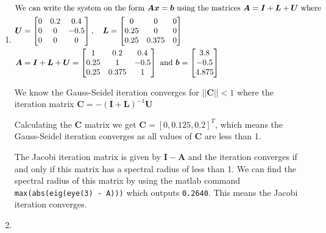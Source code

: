 \documentclass[a4paper]{article}
\begin{document}
\begin{enumerate}[label=\alph*)]
    \item 
        \begin{align}
            \intertext{We can write the system on the form \(\bm{A}\bm{x} =
                \bm{b}\) using the matrices \(\bm{A} = \bm{I} + \bm{L} +
                \bm{U}\) where}
            \bm{U} &=
            \begin{bmatrix}
                0 & 0.2 & 0.4 \\
                0 & 0 & -0.5 \\
                0 & 0 & 0 \\
            \end{bmatrix}, \quad
            \bm{L} =
            \begin{bmatrix}
                0 & 0 & 0 \\
                0.25 & 0 & 0 \\
                0.25 & 0.375 & 0 \\
            \end{bmatrix} \\
            \bm{A} &= \bm{I} + \bm{L} + \bm{U} =
            \begin{bmatrix}
                1 & 0.2 & 0.4 \\
                0.25 & 1 & -0.5 \\
                0.25 & 0.375 & 1 \\
            \end{bmatrix} 
            \text{ and }
            \bm{b} = 
                \begin{bmatrix}
                    3.8 \\
                    -0.5 \\
                    4.875 \\
                \end{bmatrix}
        \end{align}

        We know the Gauss-Seidel iteration converges for \(||\bm{C}|| < 1\)
            where the iteration matrix \(\bm{C} = -(\bm{I}+\bm{L})^{-1}\bm{U}\)

        Calculating the \(\bm{C}\) matrix we get \(\bm{C} = [0, 0.125,
            0.2]^T\), which means the Gauss-Seidel iteration converges as all values of \(\bm{C}\) are less than 1.

        The Jacobi iteration matrix is given by \(\bm{I} - \bm{A}\) and the
            iteration converges if and only if this matrix has a spectral
            radius of less than 1. We can find the spectral radius of this
            matrix by using the matlab command \texttt{max(abs(eig(eye(3) -
            A)))} which outputs \texttt{0.2640}. This means the Jacobi
            iteration converges.

    \item 
        \begin{align}
        \end{align}
\end{enumerate}




%
\end{document}
